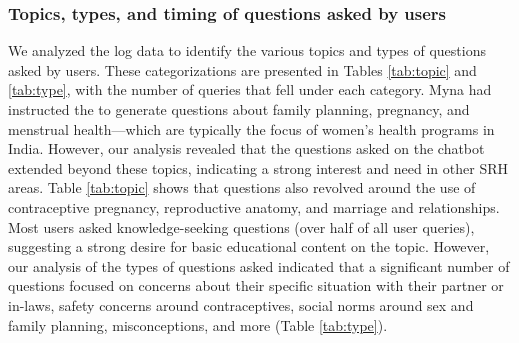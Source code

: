 \subsubsection{Topics, types, and timing of questions asked by users}
We analyzed the log data to identify the various topics and types of questions asked by users. These categorizations are presented in Tables \ref{tab:topic} and \ref{tab:type}, with the number of queries that fell under each category. Myna had instructed the   to generate questions about family planning, pregnancy, and menstrual health---which are typically the focus of women's health programs in India. However, our analysis revealed that the questions asked on the chatbot extended beyond these topics, indicating a strong interest and need in other SRH areas. Table \ref{tab:topic} shows that questions also revolved around the use of contraceptive pregnancy, reproductive anatomy, and marriage and relationships. 
Most users asked knowledge-seeking questions (over half of all user queries), suggesting a strong desire for basic educational content on the topic. However, our analysis of the types of questions asked indicated that a significant number of questions focused on concerns about their specific situation with their partner or in-laws, safety concerns around contraceptives, social norms around sex and family planning, misconceptions, and more (Table \ref{tab:type}). 

